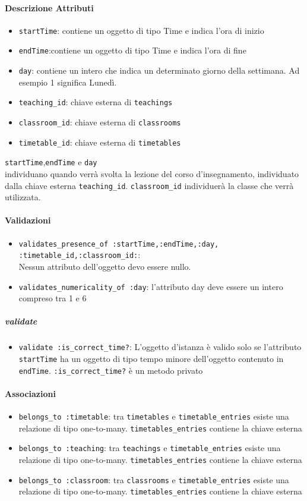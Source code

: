 \documentclass[11pt,a4paper]{article}
\begin{document}
\paragraph{Descrizione Attributi}
\begin{itemize}
 \item \verb|startTime|: contiene un oggetto di tipo Time e indica l'ora di inizio
 \item \verb|endTime|:contiene un oggetto di tipo Time e indica l'ora di fine
 \item \verb|day|: contiene un intero che indica un determinato giorno della settimana. Ad esempio 1 significa Lunedì.
 \item \verb|teaching_id|: chiave esterna di \verb|teachings|
 \item \verb|classroom_id|: chiave esterna di \verb|classrooms|
 \item \verb|timetable_id|: chiave esterna di \verb|timetables|
\end{itemize}
\verb|startTime|,\verb|endTime| e \verb|day|\\ individuano quando verrà svolta la lezione del corso d'insegnamento, individuato dalla chiave esterna \verb|teaching_id|. \verb|classroom_id| individuerà la classe che verrà utilizzata.
\paragraph{Validazioni}
\begin{itemize}
 \item \verb|validates_presence_of :startTime,:endTime,:day,|\\
	\verb|:timetable_id,:classroom_id:|:\\ 
Nessun attributo dell'oggetto devo essere nullo.
 \item \verb|validates_numericality_of :day|: l'attributo day deve essere un intero compreso tra 1 e 6
\end{itemize}
\subparagraph{validate}
\begin{itemize}
\item \verb|validate :is_correct_time?|: L'oggetto d'istanza è valido solo se l'attributo \verb|startTime| ha un oggetto di tipo tempo minore dell'oggetto contenuto in \verb|endTime|. \verb|:is_correct_time?|	 è un metodo privato
\end{itemize}
\paragraph{Associazioni}
\begin{itemize}
 \item \verb|belongs_to :timetable|: tra \verb|timetables| e \verb|timetable_entries| esiste una relazione di tipo one-to-many. \verb|timetables_entries| contiene la chiave esterna
 \item \verb|belongs_to :teaching|: tra \verb|teachings| e \verb|timetable_entries| esiste una relazione di tipo one-to-many. \verb|timetables_entries| contiene la chiave esterna 
 \item \verb|belongs_to :classroom|: tra \verb|classrooms| e \verb|timetable_entries| esiste una relazione di tipo one-to-many. \verb|timetables_entries| contiene la chiave esterna
\end{itemize}
\end{document}
